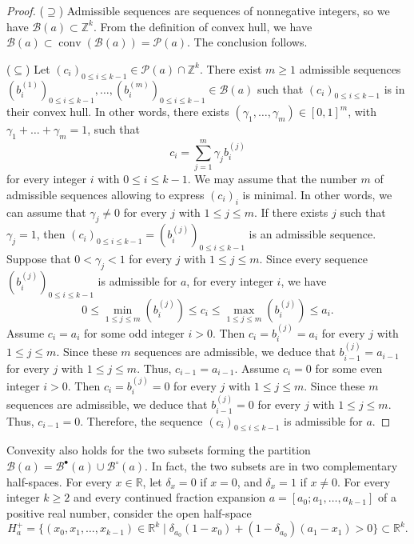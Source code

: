 \documentclass[a4paper,12pt]{amsart}
\newcommand{\Z}{\mathbb{Z}}
\newcommand{\R}{\mathbb{R}}
\newcommand{\Bcal}{{\mathcal{B}}}
\newcommand{\Pcal}{{\mathcal{P}}}
\newcommand{\0}{\mathtt{0}}
\newcommand{\1}{\mathtt{1}}
\newcommand{\2}{\mathtt{2}}
\newcommand{\3}{\mathtt{3}}
\DeclareMathOperator{\conv}{conv}
\begin{document}
\begin{proof}
    ($\supseteq$)
    Admissible sequences are sequences of nonnegative integers, so we have
    $\Bcal(a)\subset\Z^k$.
    From the definition of convex hull, we have
    $\Bcal(a)\subset\conv(\Bcal(a))=\Pcal(a)$.
    The conclusion follows.

    ($\subseteq$)
    Let $(c_i)_{0\leq i\leq k-1}\in\Pcal(a)\cap\Z^k$.
    There exist $m\geq1$ admissible sequences
    $(b_i^{(1)})_{0\leq i\leq k-1},\dots,
     (b_i^{(m)})_{0\leq i\leq k-1}\in\Bcal(a)$
    such that
    $(c_i)_{0\leq i\leq k-1}$ is in their convex hull.
    In other words,
    there exists $(\gamma_1,\dots,\gamma_m)\in[0,1]^m$,
    with $\gamma_1+\dots+\gamma_m=1$,
    such that
    \[
        c_i= \sum_{j=1}^m \gamma_j b_i^{(j)}
    \]
    for every integer $i$ with $0\leq i\leq k-1$.
    We may assume that the number $m$ of admissible sequences allowing to
    express $(c_i)_i$ is minimal. In other words, we can assume that $\gamma_j\neq
    0$ for every $j$ with $1\leq j\leq m$.
    If there exists $j$ such that $\gamma_j=1$, then
    $(c_i)_{0\leq i\leq k-1} = (b_i^{(j)})_{0\leq i\leq k-1}$ is an admissible
    sequence.
    Suppose that $0<\gamma_j<1$ for every $j$ with $1\leq j\leq m$.
    Since every sequence $(b_i^{(j)})_{0\leq i\leq k-1}$ is admissible for $a$,
    for every integer $i$, we have
    \[
        0\leq \min_{1\leq j\leq m}(b_i^{(j)}) \leq c_i
         \leq \max_{1\leq j\leq m}(b_i^{(j)}) \leq a_i.
    \]
    Assume $c_i=a_i$ for some odd integer $i>0$. Then
    $c_i=b_i^{(j)}=a_i$ for every $j$ with $1\leq j\leq m$.
    Since these $m$ sequences are admissible,
    we deduce that $b_{i-1}^{(j)}=a_{i-1}$ for every $j$ with $1\leq j\leq m$.
    Thus, $c_{i-1}=a_{i-1}$.
    Assume $c_i=0$ for some even integer $i>0$. Then
    $c_i=b_i^{(j)}=0$ for every $j$ with $1\leq j\leq m$.
    Since these $m$ sequences are admissible,
    we deduce that $b_{i-1}^{(j)}=0$ for every $j$ with $1\leq j\leq m$.
    Thus, $c_{i-1}=0$.
    Therefore, the sequence $(c_i)_{0\leq i\leq k-1}$ is admissible for $a$.
\end{proof}

Convexity also holds for the two subsets
forming the partition
$\Bcal(a)= \Bcal^\bullet(a) \cup \Bcal^\circ(a)$.
In fact, the two subsets are in two complementary half-spaces.
For every $x\in\R$, let
%
%
%
%
%
$\delta_{x}=0$ if $x=0$, and
$\delta_{x}=1$ if $x\neq 0$.
For every integer $k\geq 2$ and every continued fraction expansion
$a=[a_0;a_1,\dots,a_{k-1}]$ of a positive real number, consider
the open half-space
\[
    H_a^+ = \{(x_0,x_1,\dots,x_{k-1})\in\R^k\mid
                \delta_{a_0}(1-x_0)+(1-\delta_{a_0})(a_1-x_1)>0\}
        \subset\R^k.
\]
%
\end{document}
